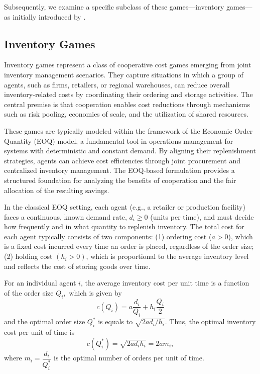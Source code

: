 \documentclass[12pt]{article}
\begin{document}
\noindent Subsequently, we examine a specific subclass of these games—inventory games—as initially introduced by \cite{Meca2003,Meca2004}.

\subsection{Inventory Games} \label{IG}

\noindent Inventory games represent a class of cooperative cost games emerging from joint inventory management scenarios. They capture situations in which a group of agents, such as firms, retailers, or regional warehouses, can reduce overall inventory-related costs by coordinating their ordering and storage activities. The central premise is that cooperation enables cost reductions through mechanisms such as risk pooling, economies of scale, and the utilization of shared resources.

\noindent These games are typically modeled within the framework of the Economic Order Quantity (EOQ) model, a fundamental tool in operations management for systems with deterministic and constant demand. By aligning their replenishment strategies, agents can achieve cost efficiencies through joint procurement and centralized inventory management. The EOQ-based formulation provides a structured foundation for analyzing the benefits of cooperation and the fair allocation of the resulting savings.

\noindent In the classical EOQ setting, each agent (e.g., a retailer or production facility) faces a continuous, known demand rate, $d_{i}\geq 0$ (units per time), and must decide how frequently and in what quantity to replenish inventory. The total cost for each agent typically consists of two components: (1) ordering cost ($a>0$), which is a fixed cost incurred every time an order is placed, regardless of the order size; (2) holding cost $\left( h_{i}>0\right)$, which is proportional to the average inventory level and reflects the cost of storing goods over time.

\noindent For an individual agent $i$, the average inventory cost per unit time is a function of the order size $Q_{i},$ which is given by 
\begin{equation*}
c\left( Q_{i}\right) =a\dfrac{d_{i}}{Q_{i}}+h_{i}\dfrac{Q_{i}}{2}
\end{equation*}%
and the optimal order size $Q^*_{i}$ is equals to $\sqrt{2ad_{i}/h_{i}}.$
Thus, the optimal inventory cost per unit of time is 
\begin{equation*}
c(Q^*_{i})=\sqrt{2ad_{i}h_{i}}=2am_{i},
\end{equation*}%
where $m_{i}=\dfrac{d_{i}}{Q^*_{i}}$ is the optimal number of orders
per unit of time.
\end{document}
